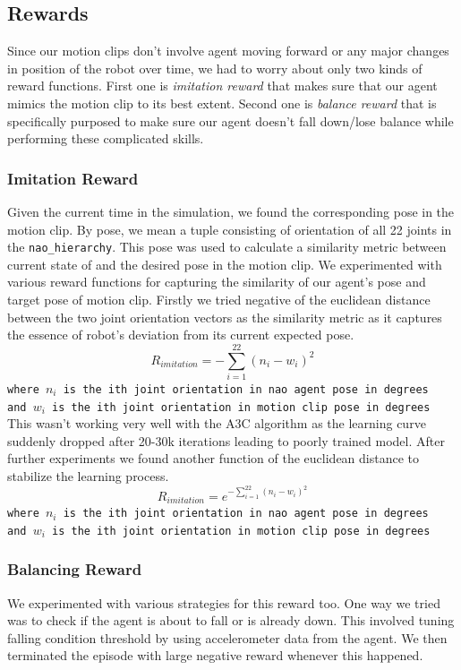 \subsection{Rewards}
Since our motion clips don't involve agent moving forward or any major changes in position of the robot over time, we had to worry about only two kinds of reward functions. First one is \textit{imitation reward} that makes sure that our agent mimics the motion clip to its best extent. Second one is \textit{balance reward} that is specifically purposed to make sure our agent doesn't fall down/lose balance while performing these complicated skills.

\subsubsection{Imitation Reward}
Given the current time in the simulation, we found the corresponding pose in the motion clip. By pose, we mean a tuple consisting of orientation of all 22 joints in the \texttt{nao\_hierarchy}. This pose was used to calculate a similarity metric between current state of and the desired pose in the motion clip. We experimented with various reward functions for capturing the similarity of our agent's pose and target pose of motion clip. Firstly we tried negative of the euclidean distance between the two joint orientation vectors as the similarity metric as it captures the essence of robot's deviation from its current expected pose. 
$$R_{imitation} = - \sum_{i=1}^{22} (n_i - w_i)^2$$
\texttt{where $n_i$ is the ith joint orientation in nao agent pose in degrees \\
and $w_i$ is the ith joint orientation in motion clip pose in degrees}
\vspace{1em}
\\
This wasn't working very well with the A3C algorithm as the learning curve suddenly dropped after 20-30k iterations leading to poorly trained model. After further experiments we found another function of the euclidean distance to stabilize the learning process. 
$$R_{imitation} = e^{- \sum_{i=1}^{22} (n_i - w_i)^2}$$
\texttt{where $n_i$ is the ith joint orientation in nao agent pose in degrees \\
and $w_i$ is the ith joint orientation in motion clip pose in degrees} 
\subsubsection{Balancing Reward}
We experimented with various strategies for this reward too. One way we tried was to check if the agent is about to fall or is already down. This involved tuning falling condition threshold by using accelerometer data from the agent. We then terminated the episode with large negative reward whenever this happened.  \\

